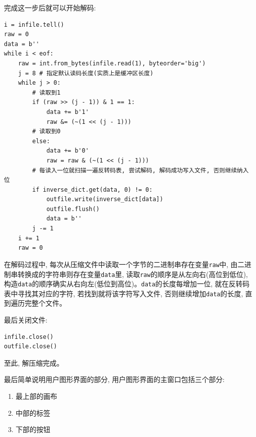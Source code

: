\documentclass{ctexart}
\begin{document}
完成这一步后就可以开始解码:

{\setmainfont{Courier New Bold}              
\begin{lstlisting}
i = infile.tell()
raw = 0
data = b''
while i < eof:
    raw = int.from_bytes(infile.read(1), byteorder='big')
    j = 8 # 指定默认读码长度(实质上是缓冲区长度)
    while j > 0:
        # 读取到1
        if (raw >> (j - 1)) & 1 == 1:
            data += b'1'
            raw &= (~(1 << (j - 1)))
        # 读取到0
        else:
            data += b'0'
            raw = raw & (~(1 << (j - 1)))
        # 每读入一位就扫描一遍反转码表, 尝试解码, 解码成功写入文件, 否则继续纳入位
        if inverse_dict.get(data, 0) != 0:
            outfile.write(inverse_dict[data])
            outfile.flush()
            data = b''
        j -= 1
    i += 1
    raw = 0
\end{lstlisting}}

在解码过程中, 每次从压缩文件中读取一个字节的二进制串存在变量\texttt{raw}中, 由二进制串转换成的字符串则存在变量\texttt{data}里, 读取\texttt{raw}的顺序是从左向右(高位到低位), 构造\texttt{data}的顺序确实从右向左(低位到高位)。\texttt{data}的长度每增加一位, 就在反转码表中寻找其对应的字符, 若找到就将该字符写入文件, 否则继续增加\texttt{data}的长度, 直到遍历完整个文件。

最后关闭文件:

{\setmainfont{Courier New Bold}              
\begin{lstlisting}
infile.close()
outfile.close()
\end{lstlisting}}

至此, 解压缩完成。

最后简单说明用户图形界面的部分, 用户图形界面的主窗口包括三个部分:

\begin{enumerate}
\def\labelenumi{\arabic{enumi}.}
\item
  最上部的画布
\item
  中部的标签
\item
  下部的按钮
\end{enumerate}
\end{document}
